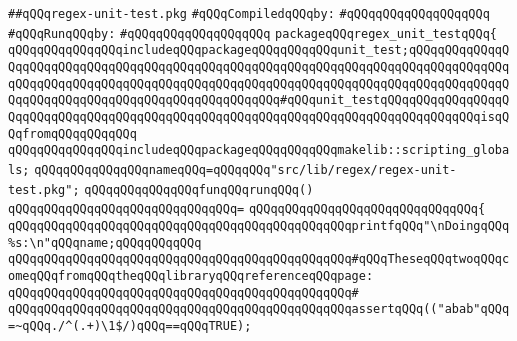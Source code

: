 \label{src/lib/regex/regex-unit-test.pkg}
\verb|##qQQqregex-unit-test.pkg|\newline
\newline
\verb|#qQQqCompiledqQQqby:|\newline
\verb|#qQQqqQQqqQQqqQQqqQQq|\newline
\newline
\verb|#qQQqRunqQQqby:|\newline
\verb|#qQQqqQQqqQQqqQQqqQQq|\newline
\newline
\verb|packageqQQqregex_unit_testqQQq{|\newline
\newline
\verb|qQQqqQQqqQQqqQQqincludeqQQqpackageqQQqqQQqqQQqunit_test;qQQqqQQqqQQqqQQqqQQqqQQqqQQqqQQqqQQqqQQqqQQqqQQqqQQqqQQqqQQqqQQqqQQqqQQqqQQqqQQqqQQqqQQqqQQqqQQqqQQqqQQqqQQqqQQqqQQqqQQqqQQqqQQqqQQqqQQqqQQqqQQqqQQqqQQqqQQqqQQqqQQqqQQqqQQqqQQqqQQqqQQqqQQqqQQq#qQQqunit_testqQQqqQQqqQQqqQQqqQQqqQQqqQQqqQQqqQQqqQQqqQQqqQQqqQQqqQQqqQQqqQQqqQQqqQQqqQQqqQQqqQQqisqQQqfromqQQqqQQqqQQq|\newline
\verb|qQQqqQQqqQQqqQQqincludeqQQqpackageqQQqqQQqqQQqmakelib::scripting_globals;|\newline
\newline
\verb|qQQqqQQqqQQqqQQqnameqQQq=qQQqqQQq"src/lib/regex/regex-unit-test.pkg";|\newline
\newline
\verb|qQQqqQQqqQQqqQQqfunqQQqrunqQQq()|\newline
\verb|qQQqqQQqqQQqqQQqqQQqqQQqqQQqqQQq=|\newline
\verb|qQQqqQQqqQQqqQQqqQQqqQQqqQQqqQQq{|\newline
\verb|qQQqqQQqqQQqqQQqqQQqqQQqqQQqqQQqqQQqqQQqqQQqqQQqprintfqQQq"\nDoingqQQq%s:\n"qQQqname;qQQqqQQqqQQq|\newline
\newline
\newline
\newline
\verb|qQQqqQQqqQQqqQQqqQQqqQQqqQQqqQQqqQQqqQQqqQQqqQQq#qQQqTheseqQQqtwoqQQqcomeqQQqfromqQQqtheqQQqlibraryqQQqreferenceqQQqpage:|\newline
\verb|qQQqqQQqqQQqqQQqqQQqqQQqqQQqqQQqqQQqqQQqqQQqqQQq#|\newline
\verb|qQQqqQQqqQQqqQQqqQQqqQQqqQQqqQQqqQQqqQQqqQQqqQQqassertqQQq(("abab"qQQq=~qQQq./^(.+)\1$/)qQQq==qQQqTRUE);|\newline

